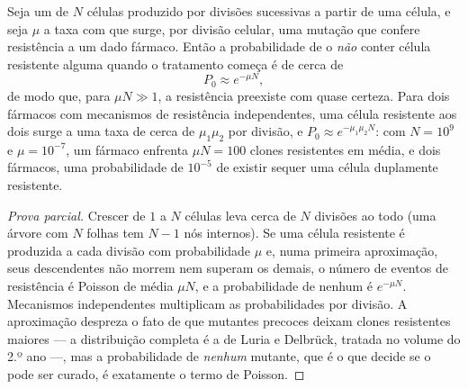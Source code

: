 \begin{theorem}\label{thm:b3:cancer-biology:goldie-coldman}
Seja um  de $N$ células produzido por divisões sucessivas a partir
de uma célula, e seja $\mu$ a taxa com que surge, por divisão celular,
uma mutação que confere resistência a um dado fármaco. Então a
probabilidade de o  \emph{não} conter célula resistente alguma
quando o tratamento começa é de cerca de
\[
P_{0} \approx e^{-\mu N},
\]
de modo que, para $\mu N \gg 1$, a resistência preexiste com quase
certeza. Para dois fármacos com mecanismos de resistência
independentes, uma célula resistente aos dois surge a uma taxa de cerca
de $\mu_{1}\mu_{2}$ por divisão, e $P_{0}
\approx e^{-\mu_{1}\mu_{2}N}$:
com $N = 10^{9}$ e $\mu = 10^{-7}$, um fármaco enfrenta $\mu N = 100$
clones resistentes em média, e dois fármacos, uma probabilidade de
$10^{-5}$ de existir sequer uma célula duplamente resistente.
\end{theorem}
\begin{proof}[Prova parcial]
Crescer de $1$ a $N$ células leva cerca de $N$ divisões ao todo (uma
árvore com $N$ folhas tem $N - 1$ nós internos). Se uma célula
resistente é produzida a cada divisão com probabilidade $\mu$ e, numa
primeira aproximação, seus descendentes não morrem nem superam os
demais, o número de eventos de resistência é Poisson de média $\mu N$,
e a probabilidade de nenhum é $e^{-\mu N}$. Mecanismos independentes
multiplicam as probabilidades por divisão. A aproximação despreza o
fato de que mutantes precoces deixam clones resistentes maiores --- a
distribuição completa é a de Luria e Delbrück, tratada no volume do
2.º ano ---, mas a probabilidade de \emph{nenhum} mutante, que é o que
decide se o  pode ser curado, é exatamente o termo de Poisson.
\end{proof}

